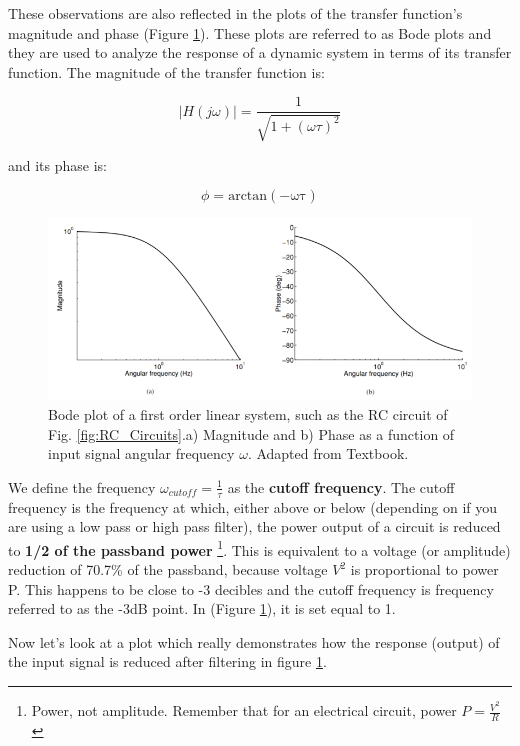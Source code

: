 These observations are also reflected in the plots of the transfer function’s
magnitude and phase (Figure \ref{fig:Filtering}). These plots are referred to as Bode plots and they are used to analyze the response of a dynamic system in terms of its transfer function. The magnitude of the transfer function is:

\begin{equation}
    |H(j \omega)| = \frac{1}{\sqrt{1 + (\omega \tau)^2}}
\end{equation}

and its phase is: 

\begin{equation}
    \phi = \mathrm{arctan(-\omega \tau)}
\end{equation}

\begin{figure}[H]
    \centering
    \includegraphics[width=0.8\linewidth]{../../Figures/Magnitude_Shift_Low_Pass.PNG}
    \caption{Bode plot of a first order linear system, such as the RC circuit of Fig. \ref{fig:RC_Circuits}.a) Magnitude and b) Phase as a function of input signal angular frequency $\omega$. Adapted from Textbook.}
    \label{fig:Filtering}
\end{figure}

We define the frequency $\omega_{cutoff} = \frac{1}{\tau}$ as the \textbf{cutoff frequency}.  The cutoff frequency is the frequency at which, either above or below (depending on if you are using a low pass or high pass filter), the power output of a circuit is reduced to \textbf{1/2 of the passband power} \footnote{Power, not amplitude. Remember that for an electrical circuit, power $P = \frac{V^2}{R}$}. This is equivalent to a voltage (or amplitude) reduction of 70.7\% of the passband, because voltage $V^2$ is proportional to power P. This happens to be close to -3 decibles and the cutoff frequency is frequency referred to as the -3dB point. In (Figure \ref{fig:Filtering}), it is set equal to 1.

Now let's look at a plot which really demonstrates how the response (output) of the input signal is reduced after filtering in figure \ref{fig:Filtering}. 

